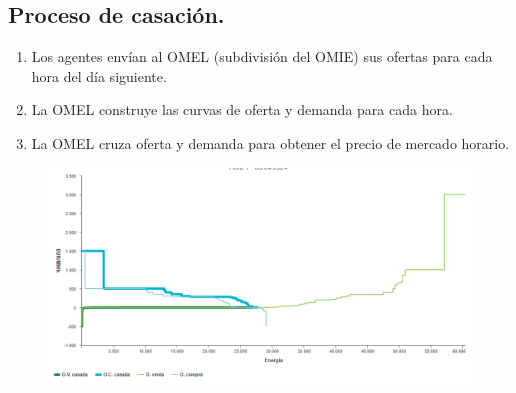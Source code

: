 \subsection{Proceso de casación.}
\begin{enumerate}
	\item Los agentes envían al OMEL (subdivisión del OMIE) sus ofertas para cada hora del día siguiente.
	\item La OMEL construye las curvas de oferta y demanda para cada hora.
	\item La OMEL cruza oferta y demanda para obtener el precio de mercado horario.
\end{enumerate}
 \begin{figure}[H]
 	\centering
 	\includegraphics[width=0.7\linewidth]{res/tema4/curvasCasacion}
 	\label{fig:curvascasacion}
 \end{figure}
 \newpage
